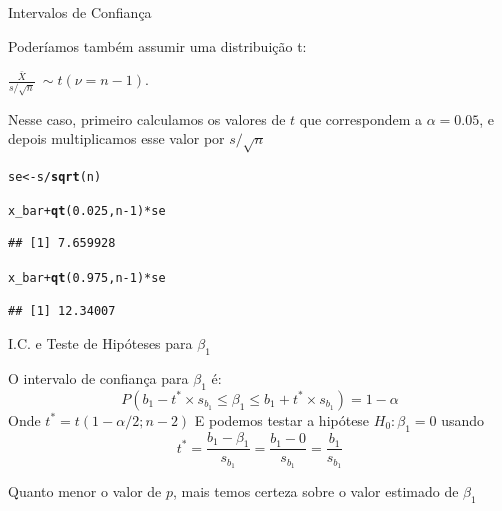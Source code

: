\documentclass{beamer}\usepackage[]{graphicx}\usepackage[]{color}
\makeatletter
\newcommand{\hlnum}[1]{\textcolor[rgb]{0.686,0.059,0.569}{#1}}%
\newcommand{\hlopt}[1]{\textcolor[rgb]{0,0,0}{#1}}%
\newcommand{\hlstd}[1]{\textcolor[rgb]{0.345,0.345,0.345}{#1}}%
\newcommand{\hlkwb}[1]{\textcolor[rgb]{0.69,0.353,0.396}{#1}}%
\newcommand{\hlkwd}[1]{\textcolor[rgb]{0.737,0.353,0.396}{\textbf{#1}}}%
\newenvironment{kframe}{%
 \def\at@end@of@kframe{}%
 \ifinner\ifhmode%
  \def\at@end@of@kframe{\end{minipage}}%
  \begin{minipage}{\columnwidth}%
 \fi\fi%
 \def\FrameCommand##1{\hskip\@totalleftmargin \hskip-\fboxsep
 \colorbox{shadecolor}{##1}\hskip-\fboxsep
     \hskip-\linewidth \hskip-\@totalleftmargin \hskip\columnwidth}%
 \MakeFramed {\advance\hsize-\width
   \@totalleftmargin\z@ \linewidth\hsize
   \@setminipage}}%
 {\par\unskip\endMakeFramed%
 \at@end@of@kframe}
\newenvironment{knitrout}{}{} %
\renewenvironment{knitrout}{\setlength{\topsep}{0mm}}{}
\makeatother
\begin{document}
\begin{frame}[fragile]{Intervalos de Confiança}

\begin{small}

Poderíamos também assumir uma distribuição t: 

$\frac{\bar{X}}{s/\sqrt{n}} ~ \sim t(\nu = n-1)$. 

Nesse caso, primeiro calculamos os valores de $t$ que correspondem a $\alpha= 0.05$, e depois multiplicamos esse valor por $s/\sqrt{n}$ 

\end{small}

\vfill

\begin{knitrout}\tiny
{}\color{fgcolor}\begin{kframe}
\begin{alltt}
\hlstd{se} \hlkwb{<-} \hlstd{s}\hlopt{/}\hlkwd{sqrt}\hlstd{(n)}

\hlstd{x_bar} \hlopt{+} \hlkwd{qt}\hlstd{(}\hlnum{0.025}\hlstd{,n}\hlopt{-}\hlnum{1}\hlstd{)}\hlopt{*} \hlstd{se}
\end{alltt}
\begin{verbatim}
## [1] 7.659928
\end{verbatim}
\begin{alltt}
\hlstd{x_bar} \hlopt{+} \hlkwd{qt}\hlstd{(}\hlnum{0.975}\hlstd{,n}\hlopt{-}\hlnum{1}\hlstd{)}\hlopt{*} \hlstd{se}
\end{alltt}
\begin{verbatim}
## [1] 12.34007
\end{verbatim}
\end{kframe}
\end{knitrout}

\end{frame}


\begin{frame}{I.C. e Teste de Hipóteses para $\beta _1$}

O intervalo de confiança para $\beta _1$ é:
\begin{equation*}
P(b_1 - t^* \times s_{b_1} \leq \beta _1 \leq b_1 + t^* \times s_{b_1} ) =  1 - \alpha
\end{equation*} \pause
Onde $t^* = t(1-\alpha/2;n-2)$ \pause
\vfill
E podemos testar a hipótese $H_0: \beta _1 = 0$ usando
\begin{equation*}
t^* = \frac{b_1 - \beta _1}{s_{b_1}} = \frac{b_1 - 0}{s_{b_1}} = \frac{b_1}{s_{b_1}}
\end{equation*}

Quanto menor o valor de $p$, mais temos certeza sobre o valor estimado de $\beta_1$


\end{frame}
\end{document}

